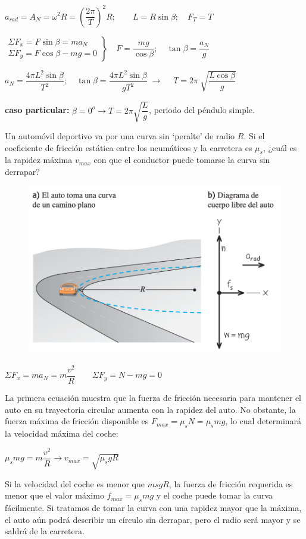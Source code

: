 $a_{rad}=A_N=\omega^2 R=\left( \dfrac {2\pi}{T} \right)^2 R;\qquad L=R \sin \beta; \quad F_T=T$

$\left. \begin{array}{ll}
\Sigma F_x=F \sin \beta = m a_N \\ \Sigma F_y=F \cos \beta -mg=0
 \end{array}\right\} \quad F=\dfrac{mg}{\cos \beta}; \quad \tan \beta=\dfrac{a_N}{g} $

$ a_N=\dfrac{4 \pi L^2 \sin \beta}{T^2}; \quad \tan \beta =\dfrac{4 \pi L^2 \sin \beta}{gT^2}\; \to \;  \quad T=2\pi \ \sqrt{\dfrac{L \cos \beta}{g}}$

\textbf{caso particular:} $\beta=0^o \to T=2\pi \sqrt{\dfrac L g}$, periodo del péndulo simple. \\ %

\begin{prob}
\begin{multicols}{2}
Un automóvil deportivo va por una curva sin `peralte' de radio $R$. Si el coeficiente de fricción estática entre los neumáticos y la carretera es $\mu_s$, ¿cuál es la rapidez máxima $v_{max}$ con que el conductor puede tomarse la curva sin derrapar?	
\begin{figure}[H]
	\centering
	\includegraphics[width=.5\textwidth]{imagenes/imagenes03/T03IM44.png}
	\end{figure}
\end{multicols}
\end{prob}

$\Sigma F_x= m a_N = m \dfrac {v^2}{R} \quad \quad  \Sigma F_y=N-mg=0
  $
 
 La primera ecuación muestra que la fuerza de fricción necesaria para mantener el auto en su trayectoria circular aumenta con la rapidez del auto. No obstante, la fuerza máxima de fricción disponible es
 $F_{max}=\mu_s N =\mu_s m g$, lo cual determinará la velocidad máxima del coche:
 
 $\mu_s m g= m \dfrac {v^2}{R} \to v_{max}=\sqrt{\mu_s g R}$
 
 \small{\textsf{Si la velocidad del coche es menor que $msgR$, la fuerza de fricción requerida es menor que el valor máximo $f_{max} = \mu_s m g$ y el coche puede tomar la curva fácilmente. Si tratamos de tomar la curva con una rapidez mayor que la máxima, el auto aún podrá describir un círculo sin derrapar, pero el radio será mayor y se saldrá de la carretera.}}
 
